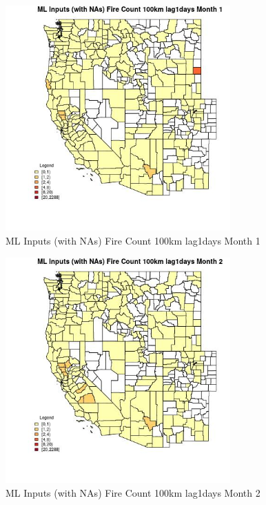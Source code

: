 \begin{figure} 
\centering  
\includegraphics[width=0.77\textwidth]{Code_Outputs/Report_ML_input_PM25_Step4_part_e_de_duplicated_aves_compiled_2019-05-20wNAs_CountyFire_Count_100km_lag1daysmedianMonth1.jpg} 
\caption{\label{fig:Report_ML_input_PM25_Step4_part_e_de_duplicated_aves_compiled_2019-05-20wNAsCountyFire_Count_100km_lag1daysmedianMonth1}ML Inputs (with NAs) Fire Count 100km lag1days Month 1} 
\end{figure} 
 

\begin{figure} 
\centering  
\includegraphics[width=0.77\textwidth]{Code_Outputs/Report_ML_input_PM25_Step4_part_e_de_duplicated_aves_compiled_2019-05-20wNAs_CountyFire_Count_100km_lag1daysmedianMonth2.jpg} 
\caption{\label{fig:Report_ML_input_PM25_Step4_part_e_de_duplicated_aves_compiled_2019-05-20wNAsCountyFire_Count_100km_lag1daysmedianMonth2}ML Inputs (with NAs) Fire Count 100km lag1days Month 2} 
\end{figure} 
 

